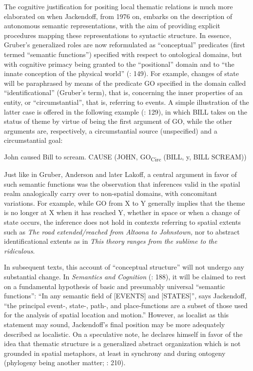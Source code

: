 \documentclass[output=paper]{langscibook}
\begin{document}
The cognitive justification for positing local thematic relations is much more elaborated on when Jackendoff, from 1976 on, embarks on the description of autonomous semantic representations, with the aim of providing explicit procedures mapping these representations to syntactic structure. In essence, Gruber’s generalized roles are now reformulated as “conceptual” predicates (first termed “semantic functions”) specified with respect to ontological domains, but with cognitive primacy being granted to the “positional” domain and to “the innate conception of the physical world” (\citeyear{jackendoff_toward_1976}: 149). For example, changes of state will be paraphrased by means of the predicate GO specified in the domain called “identificational” (Gruber’s term), that is, concerning the inner properties of an entity, or “circumstantial”, that is, referring to events. A simple illustration of the latter case is offered in the following example (\citeyear{jackendoff_toward_1976}: 129), in which BILL takes on the status of theme by virtue of being the first argument of GO, while the other arguments are, respectively, a circumstantial source (unspecified) and a circumstantial goal:

\ea
\ea John caused Bill to scream.
\ex CAUSE (JOHN, GO\textsubscript{Circ} (BILL, y, BILL SCREAM))
\z
\z

Just like in Gruber, Anderson and later Lakoff, a central argument in favor of such semantic functions was the observation that inferences valid in the spatial realm analogically carry over to non-spatial domains, with concomitant variations. For example, while GO from X to Y generally implies that the theme is no longer at X when it has reached Y, whether in space or when a change of state occurs, the inference does not hold in contexts referring to spatial extents such as \textit{The road extended\slash reached from Altoona to Johnstown,} nor to abstract identificational extents as in\textit{ This theory ranges from the sublime to the ridiculous}.

In subsequent texts, this account of “conceptual structure” will not undergo any substantial change. In \textit{Semantics and Cognition} (\citeyear{jackendoff_semantics_1983}: 188), it will be claimed to rest on a fundamental hypothesis of basic and presumably universal “semantic functions”: “In any semantic field of [EVENTS] and [STATES]”, says Jackendoff, “the principal event-, state-, path-, and place-functions are a subset of those used for the analysis of spatial location and motion.” However, as localist as this statement may sound, Jackendoff’s final position may be more adequately described as localistic. On a speculative note, he declares himself in favor of the idea that thematic structure is a generalized abstract organization which is not grounded in spatial metaphors, at least in synchrony and during ontogeny (phylogeny being another matter; \citeyear{jackendoff_semantics_1983}: 210). 
\end{document}
